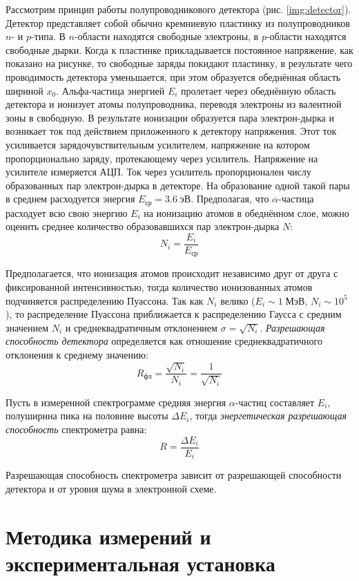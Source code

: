 \documentclass[a4paper, 12pt]{article}
\newcommand{\MeV}[1][\;]{#1 МэВ}
\newcommand{\eV}[1][\;]{#1 эВ}
\begin{document}
    Рассмотрим принцип работы полупроводникового детектора (рис. \ref{img:detector}). Детектор представляет собой обычно кремниевую пластинку из полупроводников $n$- и $p$-типа. В $n$-области находятся свободные электроны, в $p$-области находятся свободные дырки. Когда к пластинке прикладывается постоянное напряжение, как показано на рисунке, то свободные заряды покидают пластинку, в результате чего проводимость детектора уменьшается, при этом образуется обеднённая область шириной $x_0$. Альфа-частица энергией $E_i$ пролетает через обеднённую область детектора и ионизует атомы полупроводника, переводя электроны из валентной зоны в свободную. В результате ионизации образуется пара электрон-дырка и возникает ток под действием приложенного к детектору напряжения. Этот ток усиливается зарядочувствительным усилителем, напряжение на котором пропорционально заряду, протекающему через усилитель. Напряжение на усилителе измеряется АЦП. Ток через усилитель пропорционален числу образованных пар электрон-дырка в детекторе. На образование одной такой пары в среднем расходуется энергия $E_{ср} = 3.6 \eV$. Предполагая, что $\alpha$-частица расходует всю свою энергию $E_i$ на ионизацию атомов в обеднённом слое, можно оценить среднее количество образовавшихся пар электрон-дырка $N$:
    $$
    N_i = \frac{E_i}{E_{ср}}
    $$

    Предполагается, что ионизация атомов происходит независимо друг от друга с фиксированной интенсивностью, тогда количество ионизованных атомов подчиняется распределению Пуассона. Так как $N_i$ велико ($E_i \sim 1 \MeV$, $N_i \sim 10^5$), то распределение Пуассона приближается к распределению Гаусса с средним значением $N_i$ и среднеквадратичным отклонением $\sigma = \sqrt{N_i}$. \textit{Разрешающая способность детектора} определяется как отношение среднеквадратичного отклонения к среднему значению:
    $$
    R_{фл} = \frac{\sqrt{N_i}}{N_i} = \frac{1}{\sqrt{N_i}}
    $$
	
    Пусть в измеренной спектрограмме средняя энергия $\alpha$-частиц составляет $E_i$, полуширина пика на половине высоты $\Delta E_i$, тогда \textit{энергетическая разрешающая способность} спектрометра равна:
    $$
    R = \frac{\Delta E_i}{E_i}
    $$

    Разрешающая способность спектрометра зависит от разрешающей способности детектора и от уровня шума в электронной схеме.

    \newpage
    
    \section{Методика измерений и экспериментальная установка}
\end{document}
